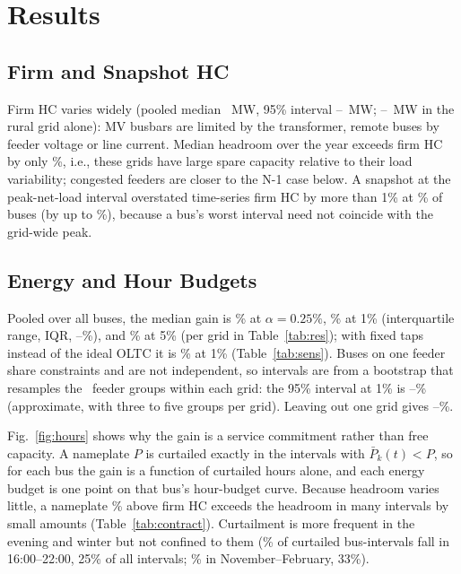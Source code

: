 \documentclass[conference,letterpaper]{IEEEtran}
\begin{document}


\section{Results}
\subsection{Firm and Snapshot HC}
Firm HC varies widely (pooled median \firmPoolMed~MW, 95\% interval \ciFirmLo--\ciFirmHi~MW; \firmminRur--\firmmaxRur~MW in the rural grid alone): MV busbars are limited by the transformer, remote buses by feeder voltage or line current. Median headroom over the year exceeds firm HC by only \spreadMed\%, i.e., these grids have large spare capacity relative to their load variability; congested feeders are closer to the N-1 case below. A snapshot at the peak-net-load interval overstated time-series firm HC by more than 1\% at \snapOverShare\% of buses (by up to \snapOverMax\%), because a bus's worst interval need not coincide with the grid-wide peak.

\subsection{Energy and Hour Budgets}
Pooled over all buses, the median gain is \poolGamed\% at $\alpha=0.25\%$, \poolGcmed\% at 1\% (interquartile range, IQR, \poolGcqa--\poolGcqc\%), and \poolGdmed\% at 5\% (per grid in Table~\ref{tab:res}); with fixed taps instead of the ideal OLTC it is \sensFixgO\% at 1\% (Table~\ref{tab:sens}). Buses on one feeder share constraints and are not independent, so intervals are from a bootstrap that resamples the \nClusters~feeder groups within each grid: the 95\% interval at 1\% is \ciGoneLo--\ciGoneHi\% (approximate, with three to five groups per grid). Leaving out one grid gives \logoLo--\logoHi\%.

Fig.~\ref{fig:hours} shows why the gain is a service commitment rather than free capacity. A nameplate $P$ is curtailed exactly in the intervals with $\bar P_k(t)<P$, so for each bus the gain is a function of curtailed hours alone, and each energy budget is one point on that bus's hour-budget curve. Because headroom varies little, a nameplate \poolGcmed\% above firm HC exceeds the headroom in many intervals by small amounts (Table~\ref{tab:contract}). Curtailment is more frequent in the evening and winter but not confined to them (\eveShare\% of curtailed bus-intervals fall in 16:00--22:00, 25\% of all intervals; \winShare\% in November--February, 33\%).
\end{document}
